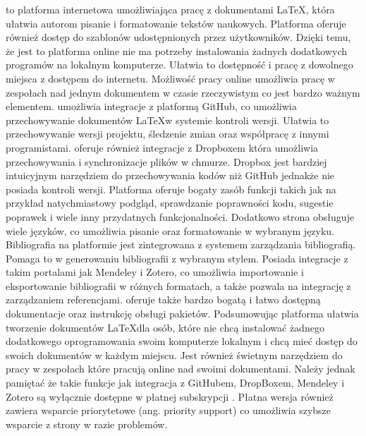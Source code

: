 \overleaflink to platforma internetowa umożliwiająca pracę z dokumentami \LaTeX, która ułatwia autorom pisanie i formatowanie tekstów naukowych. Platforma oferuje również dostęp do szablonów udostępnionych przez użytkowników. Dzięki temu, że jest to platforma online nie ma potrzeby instalowania żadnych dodatkowych programów na lokalnym komputerze. Ułatwia to dostępność i pracę z dowolnego miejsca z dostępem do internetu. Możliwość pracy online umożliwia pracę w zespołach nad jednym dokumentem w czasie rzeczywistym co jest bardzo ważnym elementem. \overleaflink umożliwia integracje z platformą GitHub, co umożliwia przechowywanie dokumentów \LaTeX w systemie kontroli wersji. Ułatwia to przechowywanie wersji projektu, śledzenie zmian oraz współpracę z innymi programistami. \overleaflink oferuje również integracje z Dropboxem która umożliwia przechowywania i synchronizacje plików w chmurze. Dropbox jest bardziej intuicyjnym narzędziem do przechowywania kodów niż GitHub jednakże nie posiada kontroli wersji. Platforma oferuje bogaty zasób funkcji takich jak na przykład natychmiastowy podgląd, sprawdzanie poprawności kodu, sugestie poprawek i wiele inny przydatnych funkcjonalności. Dodatkowo strona obsługuje wiele języków, co umożliwia pisanie oraz formatowanie w wybranym języku. Bibliografia na platformie jest zintegrowana z systemem zarządzania bibliografią. Pomaga to w generowaniu bibliografii z wybranym stylem. Posiada integracje z takim portalami jak Mendeley i Zotero, co umożliwia importowanie i eksportowanie bibliografii w różnych formatach, a także pozwala na integrację z zarządzaniem referencjami. \overleaflink oferuje także bardzo bogatą i łatwo dostępną dokumentacje oraz instrukcję obsługi pakietów. Podsumowując platforma ułatwia tworzenie dokumentów \LaTeX dla osób, które nie chcą instalować żadnego dodatkowego oprogramowania swoim komputerze lokalnym i chcą mieć dostęp do swoich dokumentów w każdym miejscu. Jest również świetnym narzędziem do pracy w zespołach które pracują online nad swoimi dokumentami. Należy jednak pamiętać że takie funkcje jak integracja z GitHubem, DropBoxem, Mendeley i Zotero są wyłącznie dostępne w płatnej subskrypcji \overleaflink. Płatna wersja również zawiera wsparcie priorytetowe (ang. priority support) co umożliwia szybsze wsparcie z strony \overleaflink w razie problemów.  

